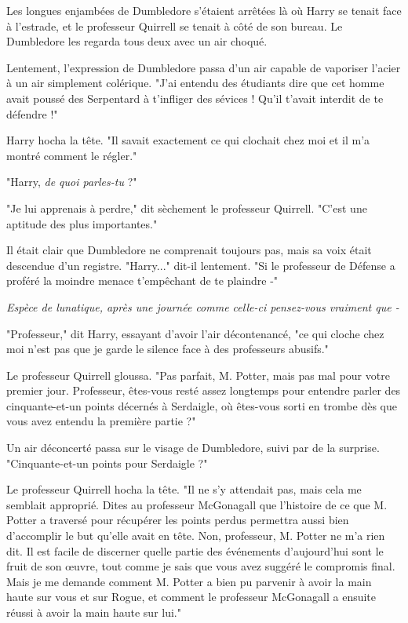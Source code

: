 Les longues enjambées de Dumbledore s'étaient arrêtées là où Harry se tenait face à l'estrade, et le professeur Quirrell se tenait à côté de son bureau. Le Dumbledore les regarda tous deux avec un air choqué.

Lentement, l'expression de Dumbledore passa d'un air capable de vaporiser l'acier à un air simplement colérique. "J'ai entendu des étudiants dire que cet homme avait poussé des Serpentard à t'infliger des sévices ! Qu'il t'avait interdit de te défendre !"

Harry hocha la tête. "Il savait exactement ce qui clochait chez moi et il m'a montré comment le régler."

"Harry, \emph{de quoi parles-tu}  ?"

"Je lui apprenais à perdre," dit sèchement le professeur Quirrell. "C'est une aptitude des plus importantes."

Il était clair que Dumbledore ne comprenait toujours pas, mais sa voix était descendue d'un registre. "Harry..." dit-il lentement. "Si le professeur de Défense a proféré la moindre menace t'empêchant de te plaindre -"

\emph{Espèce de lunatique, après une journée comme celle-ci pensez-vous vraiment que -} 

"Professeur," dit Harry, essayant d'avoir l'air décontenancé, "ce qui cloche chez moi n'est pas que je garde le silence face à des professeurs abusifs."

Le professeur Quirrell gloussa. "Pas parfait, M. Potter, mais pas mal pour votre premier jour. Professeur, êtes-vous resté assez longtemps pour entendre parler des cinquante-et-un points décernés à Serdaigle, où êtes-vous sorti en trombe dès que vous avez entendu la première partie ?"

Un air déconcerté passa sur le visage de Dumbledore, suivi par de la surprise. "Cinquante-et-un points pour Serdaigle ?"

Le professeur Quirrell hocha la tête. "Il ne s'y attendait pas, mais cela me semblait approprié. Dites au professeur McGonagall que l'histoire de ce que M. Potter a traversé pour récupérer les points perdus permettra aussi bien d'accomplir le but qu'elle avait en tête. Non, professeur, M. Potter ne m'a rien dit. Il est facile de discerner quelle partie des événements d'aujourd'hui sont le fruit de son œuvre, tout comme je sais que vous avez suggéré le compromis final. Mais je me demande comment M. Potter a bien pu parvenir à avoir la main haute sur vous et sur Rogue, et comment le professeur McGonagall a ensuite réussi à avoir la main haute sur lui."

